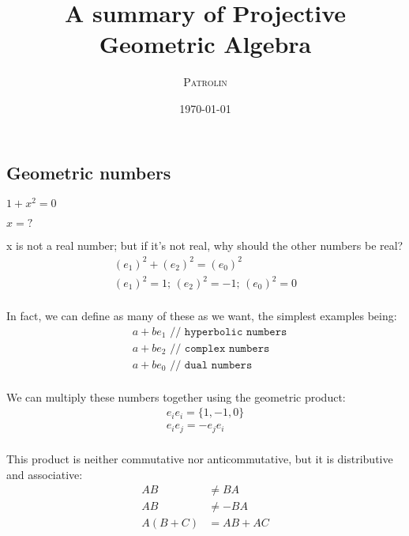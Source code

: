 \documentclass[twoside]{article}
\title{A summary of Projective Geometric Algebra}
\author{\textsc{Patrolin}}
\date{\today}
\newcommand{\T}[1]{\textrm{#1}} %
\newcommand{\B}[1]{\left(#1\right)} %
\begin{document}
    \maketitle
    \thispagestyle{empty}

    \begin{multicols*}{2}
        \section{Geometric numbers}
            \centerline{$ 1 + x^2 = 0 $}
            \centerline{$ x = \T{?} $}\vspace{5px}
            \par
                x is not a real number; but if it's not real, why should the other numbers be real?
                \begin{gather*}
                    \B{e_1}^2 + \B{e_2}^2 = \B{e_0}^2 \\
                    \B{e_1}^2 = 1;\, \B{e_2}^2 = -1;\, \B{e_0}^2 = 0 \\
                \end{gather*}
            \par
                In fact, we can define as many of these as we want, the simplest examples being:
                $$\begin{aligned}
                    &a + b e_1 \texttt{ // hyperbolic numbers} \\
                    &a + b e_2 \texttt{ // complex numbers} \\
                    &a + b e_0 \texttt{ // dual numbers} \\
                \end{aligned}$$
            \par
                We can multiply these numbers together using the geometric product:
                \begin{gather*}
                    e_i e_i = \{1, -1, 0\} \\
                    e_i e_j = -e_j e_i \\
                \end{gather*}
            \par
                This product is neither commutative nor anticommutative, but it is distributive and associative:
                $$\begin{aligned}
                    AB &\neq BA \\
                    AB &\neq -BA \\
                    A(B+C) &= AB + AC \\

\end{aligned}$$
\end{multicols*}
\end{document}
